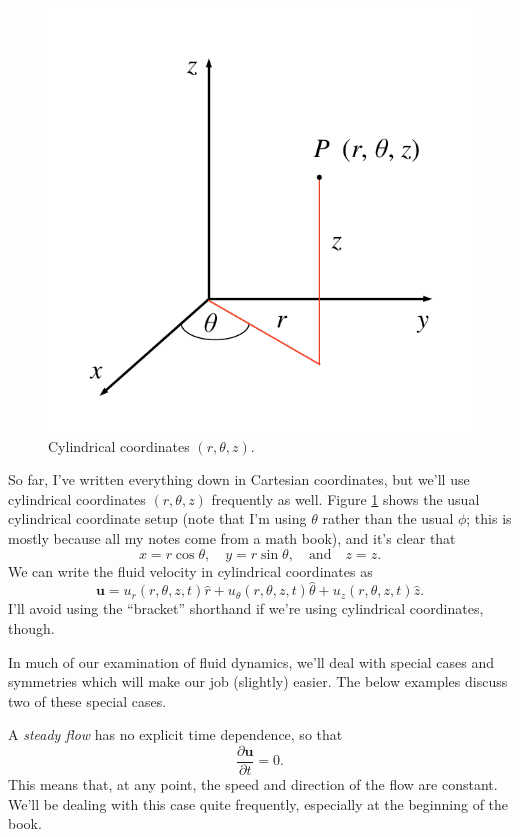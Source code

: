 \begin{figure}
\centering\includegraphics[width=0.5\linewidth]{Figures/Chapter1/fig_cyl_coord}
\caption{Cylindrical coordinates $(r, \theta, z)$.}
\label{fig_cyl_coord}
\end{figure}

So far, I've written everything down in Cartesian coordinates, but we'll use cylindrical coordinates $(r, \theta, z)$ frequently as well.  Figure \ref{fig_cyl_coord} shows the usual cylindrical coordinate setup (note that I'm using $\theta$ rather than the usual $\phi$; this is mostly because all my notes come from a math book), and it's clear that
\[
x = r \cos \theta, \quad y = r \sin \theta, \quad \text{and} \quad z = z.
\]
We can write the fluid velocity in cylindrical coordinates as
\begin{equation}
\label{eq_u_cyl}
\mathbf{u} = u_r(r, \theta, z, t) \hat{r} + u_\theta (r, \theta, z, t) \hat{\theta} + u_z(r, \theta, z, t) \hat{z}.
\end{equation}
I'll avoid using the ``bracket'' shorthand if we're using cylindrical coordinates, though.



In much of our examination of fluid dynamics, we'll deal with special cases and symmetries which will make our job (slightly) easier.  The below examples discuss two of these special cases.

\begin{example}
A \emph{steady flow} has no explicit time dependence, so that
\begin{equation}
\frac{\partial \mathbf{u}}{\partial t} = 0.
\end{equation}
This means that, at any point, the speed and direction of the flow are constant. We'll be dealing with this case quite frequently, especially at the beginning of the book.
\end{example}

